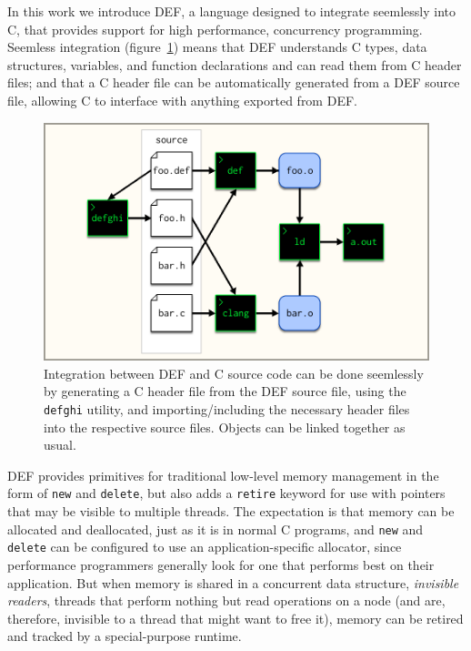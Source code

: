 In this work we introduce DEF, a language designed to integrate seemlessly into C, that provides support for high performance, concurrency programming.  Seemless integration (figure~\ref{fig:seemless-integration}) means that DEF understands C types, data structures, variables, and function declarations and can read them from C header files; and that a C header file can be automatically generated from a DEF source file, allowing C to interface with anything exported from DEF.

\begin{figure}[htbp!]
        \centering
        \includegraphics[scale=0.25]{gfx/seemless-integration}
        \caption{Integration between DEF and C source code can be done seemlessly by generating a C header file from the DEF source file, using the \texttt{defghi} utility, and importing/including the necessary header files into the respective source files.  Objects can be linked together as usual.}
        \label{fig:seemless-integration}
\end{figure}

DEF provides primitives for traditional low-level memory management in the form of \texttt{new} and \texttt{delete}, but also adds a \texttt{retire} keyword for use with pointers that may be visible to multiple threads.  The expectation is that memory can be allocated and deallocated, just as it is in normal C programs, and \texttt{new} and \texttt{delete} can be configured to use an application-specific allocator, since performance programmers generally look for one that performs best on their application.  But when memory is shared in a concurrent data structure, \textit{invisible readers}, threads that perform nothing but read operations on a node (and are, therefore, invisible to a thread that might want to free it), memory can be retired and tracked by a special-purpose runtime.

